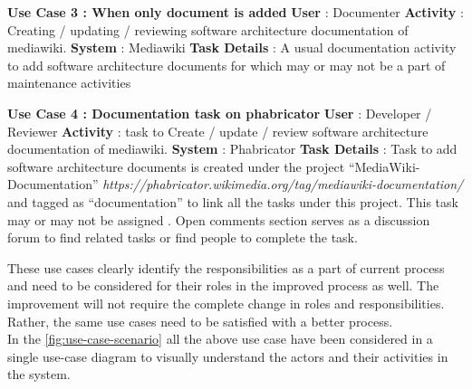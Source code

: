 \begin{mdframed}[leftmargin=10pt,rightmargin=10pt]
\textbf{Use Case 3 : When only document is added}
 \newline \newline \indent \textbf{User} : Documenter
 \newline \newline \indent \textbf{Activity} : Creating / updating / reviewing software architecture documentation of mediawiki.
 \newline \newline \indent \textbf{System} : Mediawiki
 \newline \newline \indent \textbf{Task Details} : A usual documentation activity to add software architecture documents for which may or may not be a part of maintenance activities
\end{mdframed}

\begin{mdframed}[leftmargin=10pt,rightmargin=10pt]
\textbf{Use Case 4 : Documentation task on phabricator}
\newline \newline \indent \textbf{User} : Developer / Reviewer
\newline \newline \indent \textbf{Activity} : task to Create / update / review software architecture documentation of mediawiki.
\newline \newline \indent \textbf{System} : Phabricator
\newline \newline \indent \textbf{Task Details} : Task to add software architecture documents is created under the project \enquote{MediaWiki-Documentation} \emph{https://phabricator.wikimedia.org/tag/mediawiki-documentation/} and tagged as \enquote{documentation} to link all the tasks under this project. This task may or may not be assigned . Open comments section serves as a discussion forum to find related tasks or find people to complete the task.
\end{mdframed}
These use cases clearly identify the responsibilities as a part of current process and need to be considered for their roles in the improved process as well. The improvement will not require the complete change in roles and responsibilities. Rather, the same use cases need to be satisfied with a better process.
\newline
\\\indent In the \autoref{fig:use-case-scenario} all the above use case have been considered in a single use-case diagram to visually understand the actors and their activities in the system.


